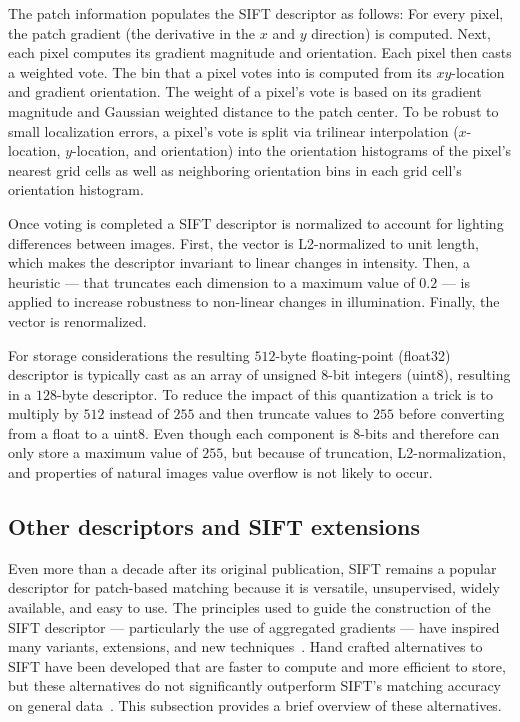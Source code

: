         The patch information populates the SIFT descriptor as follows: For every pixel, the patch gradient (the
        derivative in the $x$ and $y$ direction) is computed. Next, each pixel computes its gradient magnitude and
        orientation. Each pixel then casts a weighted vote. The bin that a pixel votes into is computed from its
        $xy$-location and gradient orientation. The weight of a pixel's vote is based on its gradient magnitude and
        Gaussian weighted distance to the patch center. To be robust to small localization errors, a pixel's vote
        is split via trilinear interpolation ($x$-location, $y$-location, and orientation) into the orientation
        histograms of the pixel's nearest grid cells as well as neighboring orientation bins in each grid cell's
        orientation histogram.

        Once voting is completed a SIFT descriptor is normalized to account for lighting differences between
        images. First, the vector is L2-normalized to unit length, which makes the descriptor invariant to linear
        changes in intensity. Then, a heuristic --- that truncates each dimension to a maximum value of $0.2$ ---
        is applied to increase robustness to non-linear changes in illumination. Finally, the vector is
        renormalized.

        For storage considerations the resulting $512$-byte floating-point (float32) descriptor is typically cast
          as an array of unsigned $8$-bit integers (uint8), resulting in a $128$-byte descriptor.
        To reduce the impact of this quantization a trick is to multiply by $512$ instead of $255$ and then
          truncate values to $255$ before converting from a float to a uint8.
        Even though each component is $8$-bits and therefore can only store a maximum value of $255$, but because
          of truncation, L2-normalization, and properties of natural images value overflow is not likely to occur.
    
       \vizfeatrow{}

    \subsection{Other descriptors and SIFT extensions}
        Even more than a decade after its original publication, SIFT remains a popular descriptor for patch-based
        matching because it is versatile, unsupervised, widely available, and easy to use. The principles used to
        guide the construction of the SIFT descriptor --- particularly the use of aggregated gradients --- have
        inspired many variants, extensions, and new techniques~\cite{mikolajczyk_performance_2005,
        dalal_histograms_2005, bay_surf_2006}. Hand crafted alternatives to SIFT have been developed that are
        faster to compute and more efficient to store, but these alternatives do not significantly outperform
        SIFT's matching accuracy on general data~\cite{lowe_distinctive_2004, mikolajczyk_performance_2005,
        alahi_freak_2012}. This subsection provides a brief overview of these alternatives.

